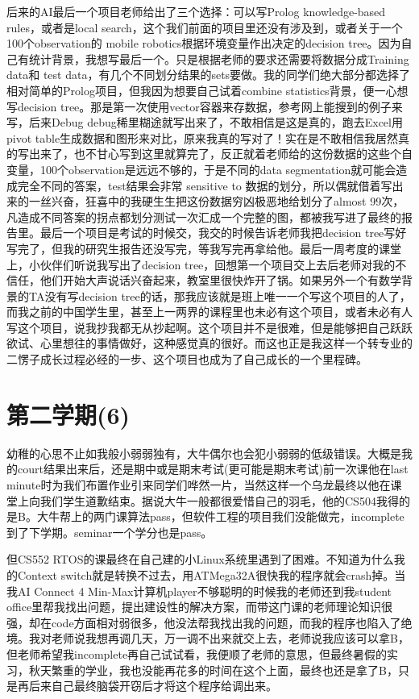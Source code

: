 \documentclass[12pt]{book}
\begin{document}
后来的AI最后一个项目老师给出了三个选择：可以写Prolog knowledge-based rules，或者是local search，这个我们前面的项目里还没有涉及到，或者关于一个100个observation的 mobile robotics根据环境变量作出决定的decision tree。因为自己有统计背景，我想写最后一个。只是根据老师的要求还需要将数据分成Training data和 test data，有几个不同划分结果的sets要做。我的同学们绝大部分都选择了相对简单的Prolog项目，但我因为想要自己试着combine statistics背景，便一心想写decision tree。那是第一次使用vector容器来存数据，参考网上能搜到的例子来写，后来Debug debug稀里糊途就写出来了，不敢相信是这是真的，跑去Excel用pivot table生成数据和图形来对比，原来我真的写对了！实在是不敢相信我居然真的写出来了，也不甘心写到这里就算完了，反正就着老师给的这份数据的这些个自变量，100个observation是远远不够的，于是不同的data segmentation就可能会造成完全不同的答案，test结果会非常 sensitive to 数据的划分，所以偶就借着写出来的一丝兴奋，狂喜中的我硬生生把这份数据穷凶极恶地给划分了almost 99次，凡造成不同答案的拐点都划分测试一次汇成一个完整的图，都被我写进了最终的报告里。最后一个项目是考试的时候交，我交的时候告诉老师我把decision tree写好写完了，但我的研究生报告还没写完，等我写完再拿给他。最后一周考度的课堂上，小伙伴们听说我写出了decision tree，回想第一个项目交上去后老师对我的不信任，他们开始大声说话兴奋起来，教室里很快炸开了锅。如果另外一个有数学背景的TA没有写decision tree的话，那我应该就是班上唯一一个写这个项目的人了，而我之前的中国学生里，甚至上一两界的课程里也未必有这个项目，或者未必有人写这个项目，说我抄我都无从抄起啊。这个项目并不是很难，但是能够把自己跃跃欲试、心里想往的事情做好，这种感觉真的很好。而这也正是我这样一个转专业的二愣子成长过程必经的一步、这个项目也成为了自己成长的一个里程碑。

\section{第二学期(6)}
\label{sec-4-6}

幼稚的心思不止如我般小弱弱独有，大牛偶尔也会犯小弱弱的低级错误。大概是我的court结果出来后，还是期中或是期末考试(更可能是期末考试)前一次课他在last minute时为我们布置作业引来同学们哗然一片，当然这样一个乌龙最终以他在课堂上向我们学生道歉结束。据说大牛一般都很爱惜自己的羽毛，他的CS504我得的是B。大牛帮上的两门课算法pass，但软件工程的项目我们没能做完，incomplete到了下学期。seminar一个学分也是pass。

但CS552 RTOS的课最终在自己建的小Linux系统里遇到了困难。不知道为什么我的Context switch就是转换不过去，用ATMega32A很快我的程序就会crash掉。当我AI Connect 4 Min-Max计算机player不够聪明的时候我的老师还到我student office里帮我找出问题，提出建设性的解决方案，而带这门课的老师理论知识很强，却在code方面相对弱很多，他没法帮我找出我的问题，而我的程序也陷入了绝境。我对老师说我想再调几天，万一调不出来就交上去，老师说我应该可以拿B，但老师希望我incomplete再自己试试看，我便顺了老师的意思，但最终暑假的实习，秋天繁重的学业，我也没能再花多的时间在这个上面，最终也还是拿了B，只是再后来自己最终脑袋开窃后才将这个程序给调出来。
\end{document}
